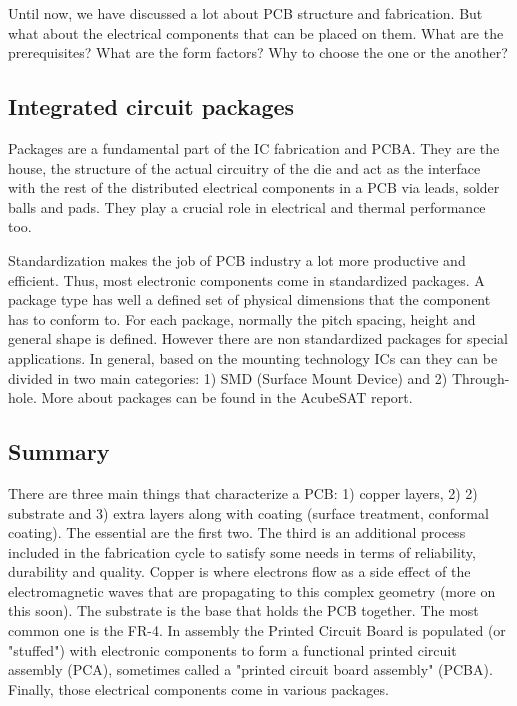 \documentclass[final]{cubedoc}
\begin{document}
	Until now, we have discussed a lot about PCB structure and fabrication. But what about the electrical components that can be placed on them. What are the prerequisites? What are the form factors? Why to choose the one or the another?
	
	\subsection{Integrated circuit packages}
	
	Packages are a fundamental part of the IC fabrication and PCBA. They are the house, the structure of the actual circuitry of the die and act as the interface with the rest of the distributed electrical components in a PCB via leads, solder balls and pads. They play a crucial role in electrical and thermal performance too.
	
	Standardization makes the job of PCB industry a lot more productive and efficient. Thus, most electronic components come in standardized packages. A package type has well a defined set of physical dimensions that the component has to conform to. For each package, normally the pitch spacing, height and general shape is defined. However there are non standardized packages for special applications. In general, based on the mounting technology ICs can they can be divided in two main categories: 1) SMD (Surface Mount Device) and 2) Through-hole. More about packages can be found in the AcubeSAT report.
	
	
	\subsection{Summary}
	
	There are three main things that characterize a PCB: 1) copper layers, 2) 2) substrate and 3) extra layers along with coating (surface treatment, conformal coating). The essential are the first two. The third is an additional process included in the fabrication cycle to satisfy some needs in terms of reliability, durability and quality. Copper is where electrons flow as a side effect of the electromagnetic waves that are propagating to this complex geometry (more on this soon). The substrate is the base that holds the PCB together. The most common one is the FR-4. In assembly the Printed Circuit Board is populated (or "stuffed") with electronic components to form a functional printed circuit assembly (PCA), sometimes called a "printed circuit board assembly" (PCBA). Finally, those electrical components come in various packages. 
	
\end{document}
